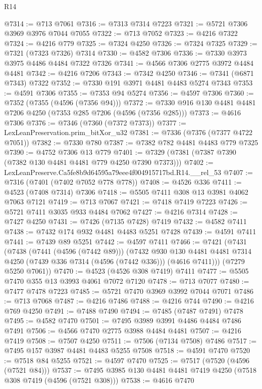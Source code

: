 \begin{lexlean}{R14}
\begin{coremodule}
@7314 := @713 @7061
@7316 := @7313 @7314 @7223
@7321 := @5721 @7306 @3969 @3976 @7044 @7055
@7322 := @713 @7052
@7323 := @4216 @7322
@7324 := @4216 @779
@7325 := @7324 @4250
@7326 := @7324 @7325
@7329 := @7321 (@7323 @7326) @7314
@7330 := @4582 @7306
@7336 := @7330 @3973 @3975 @4486 @4484 @7322 @7326
@7341 := @4566 @7306 @2775 @3972 @4484 @4481
@7342 := @4216 @7206
@7343 := @7342 @4250
@7346 := @7341 (@6871 @7343) @7322
@7352 := @7330 @191 @3971 @4481 @4483 @5274 @7343
@7353 := @4591 @7306
@7355 := @7353 @94 @5274
@7356 := @4597 @7306
@7360 := @7352 (@7355 (@4596 (@7356 @94)))
@7372 := @7330 @916 @130 @4481 @4481 @7206 @4250 (@7353 @285 @7206 (@4596 (@7356 @285)))
@7373 := @4616 @7306
@7376 := @7346 (@7360 (@7372 @7373))
@7377 := LexLeanPreservation.prim_bitXor_u32
@7381 := @7336 (@7376 (@7377 @4722 @7051))
@7382 := @7330 @780
@7387 := @7382 @782 @4481 @4483 @779 @7325
@7390 := @4752 @7306 @13 @779
@7401 := @7329 (@7381 (@7387 @7390 (@7382 @130 @4481 @4481 @779 @4250 @7390 @7373)))
@7402 := LexLeanPreserve.Ca5fe8b9d64595a79eee4f004915717bd.R14.__rel_53
@7407 := @7316 (@7401 (@7402 @7052 @778 @778))
@7408 := @4526 @336
@7411 := @4523 (@7408 @7314) @7306
@7418 := @5505 @7411 @308 @13 @3981 @4062 @7063 @7121
@7419 := @713 @7067
@7421 := @7418 @7419 @7223
@7426 := @5721 @7411 @3035 @933 @4484 @7062
@7427 := @4216 @7314
@7428 := @7427 @4250
@7431 := @7426 (@7135 @7428) @7419
@7432 := @4582 @7411
@7438 := @7432 @174 @932 @4481 @4483 @5251 @7428
@7439 := @4591 @7411
@7441 := @7439 @89 @5251
@7442 := @4597 @7411
@7466 := @7421
    (@7431
      (@7438
        (@7441 (@4596 (@7442 @89)))
        (@7432
          @930
          @130
          @4481
          @4481
          @7314
          @4250
          (@7439 @336 @7314 (@4596 (@7442 @336)))
          (@4616 @7411)))
      (@7279 @5250 @7061))
@7470 := @4523 (@4526 @308 @7419) @7411
@7477 := @5505 @7470 @355 @13 @3993 @4061 @7072 @7120
@7478 := @713 @7077
@7480 := @7477 @7478 @7223
@7485 := @5721 @7470 @3969 @3992 @7044 @7071
@7486 := @713 @7068
@7487 := @4216 @7486
@7488 := @4216 @744
@7490 := @4216 @769 @4250
@7491 := @7488 @7490
@7494 := @7485 (@7487 @7491) @7478
@7495 := @4582 @7470
@7501 := @7495 @3989 @3991 @4486 @4484 @7486 @7491
@7506 := @4566 @7470 @2775 @3988 @4484 @4481
@7507 := @4216 @7419
@7508 := @7507 @4250
@7511 := @7506 (@7134 @7508) @7486
@7517 := @7495 @157 @3987 @4481 @4483 @5255 @7508
@7518 := @4591 @7470
@7520 := @7518 @84 @5255
@7521 := @4597 @7470
@7525 := @7517 (@7520 (@4596 (@7521 @84)))
@7537 := @7495 @3985 @130 @4481 @4481 @7419 @4250 (@7518 @308 @7419 (@4596 (@7521 @308)))
@7538 := @4616 @7470

\end{coremodule}
\end{lexlean}
